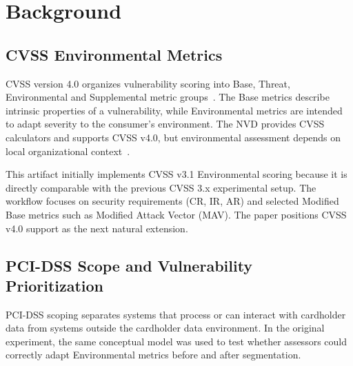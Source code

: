 \section{Background}

\subsection{CVSS Environmental Metrics}

CVSS version 4.0 organizes vulnerability scoring into Base, Threat,
Environmental and Supplemental metric groups~\cite{firstcvss40}. The Base
metrics describe intrinsic properties of a vulnerability, while Environmental
metrics are intended to adapt severity to the consumer's environment. The NVD
provides CVSS calculators and supports CVSS v4.0, but environmental assessment
depends on local organizational context~\cite{nvdcvss,nvdcvss40support}.

This artifact initially implements CVSS v3.1 Environmental scoring because it
is directly comparable with the previous CVSS 3.x experimental setup. The
workflow focuses on security requirements (CR, IR, AR) and selected Modified
Base metrics such as Modified Attack Vector (MAV). The paper positions CVSS
v4.0 support as the next natural extension.

\subsection{PCI-DSS Scope and Vulnerability Prioritization}

PCI-DSS scoping separates systems that process or can interact with cardholder
data from systems outside the cardholder data environment. In the original
experiment, the same conceptual model was used to test whether assessors could
correctly adapt Environmental metrics before and after segmentation.
